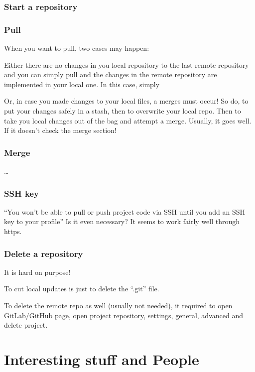 \subsubsection{Start a repository}



\subsubsection{Pull}
When you want to pull, two cases may happen: 

Either there are no changes in you local repository to the last remote repository and you can simply pull and the changes in the remote repository are implemented in your local one. In this case, simply 

Or, in case you made changes to your local files, a merges must occur!
So do,  to put your changes safely in a stash, then  to overwrite your local repo. Then  to take you local changes out of the bag and attempt a merge. Usually, it goes well. If it doesn't check the merge section!

\subsubsection{Merge}
\dots

\subsubsection{SSH key}
``You won't be able to pull or push project code via SSH until you add an SSH key to your profile''
Is it even necessary? It seems to work fairly well through https.


\subsubsection{Delete a repository}
It is hard on purpose! 

To cut local updates is just to delete the ``.git'' file.

To delete the remote repo as well (usually not needed), it required to open GitLab/GitHub page, open project repository, settings, general, advanced and delete project.



\section{Interesting stuff and People}

